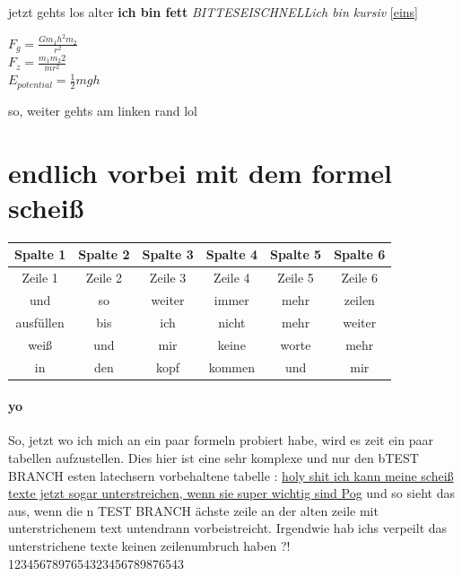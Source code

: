 \documentclass[a4paper]{scrartcl}
\begin{document}
				jetzt gehts los alter \textbf{ich bin fett}
				\emph{BITTESEISCHNELL}\textit{ich bin kursiv}
				\ref{eins}
				\linebreak[3]
				\\ \begin{center} \huge ${F}_{g}=\frac{G{m}_{1}h^2{m}_{2}}{{r}^{2}}$
				\linebreak[5]
				\\ {\color{red}${F}_{z}=\frac{{m}_{1}{m}_{2}{2}}{{}{m r}^{2}}$}
				\linebreak[5]
				\\$E_{potential}=\frac{{1}}{2}mgh$
				\linebreak[10]
				
				\end{center}
			
			so, weiter gehts am linken rand lol
		
		\section{endlich vorbei mit dem formel scheiß}
		\begin{tabular}{||c||c||c||c||c||c|}
	
			\hline 
			Spalte 1  & Spalte 2 & Spalte 3 & Spalte 4 & Spalte 5 & Spalte 6 \\ 
			\hline 
			Zeile 1  & Zeile 2  & Zeile 3  & Zeile 4 & Zeile 5 & Zeile 6 \\ 
			\hline 
			und  & so  & weiter  & immer  & mehr  & zeilen  \\ 
			\hline 
			ausfüllen & bis  & ich  & nicht  & mehr  & weiter \\ 
			\hline 
			weiß  & und  & mir  & keine  & worte  & mehr \\ 
			\hline 
			in  & den & kopf  & kommen  & und  & mir \\ 
			\hline
		\end{tabular} 
		
		\paragraph{yo}
		So, jetzt wo ich mich an ein paar formeln probiert habe, wird es zeit ein paar tabellen aufzustellen. Dies hier ist eine sehr komplexe und nur den bTEST BRANCH esten latechsern vorbehaltene tabelle :
		\underline{holy shit ich kann meine scheiß texte jetzt sogar unterstreichen, wenn sie super wichtig sind Pog} und so sieht das aus, wenn die n TEST BRANCH ächste zeile an der alten zeile mit
		 unterstrichenem text untendrann vorbeistreicht. Irgendwie hab ichs verpeilt das unterstrichene texte keinen zeilenumbruch haben ?!  1234567897654323456789876543 
\end{document}
